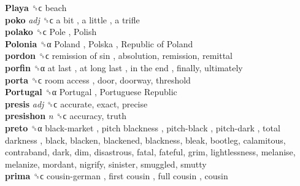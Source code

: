 \textbf{Playa} ␝ϲ  beach  \\
\textbf{poko} \emph{adj}  ␝ϲ   a bit ,  a little ,  a trifle   \\
\textbf{polako} ␝ϲ   Pole ,  Polish   \\
\textbf{Polonia} ␝α   Poland ,  Polska ,  Republic of Poland   \\
\textbf{pordon} ␝ϲ   remission of sin , absolution, remission, remittal  \\
\textbf{porfin} ␝α   at last ,  at long last ,  in the end , finally, ultimately  \\
\textbf{porta} ␝ϲ   room access , door, doorway, threshold  \\
\textbf{Portugal} ␝α   Portugal ,  Portuguese Republic   \\
\textbf{presis} \emph{adj}  ␝ϲ  accurate, exact, precise  \\
\textbf{presishon} \emph{n}  ␝ϲ  accuracy, truth  \\
\textbf{preto} ␝α   black-market ,  pitch blackness ,  pitch-black ,  pitch-dark ,  total darkness , black, blacken, blackened, blackness, bleak, bootleg, calamitous, contraband, dark, dim, disastrous, fatal, fateful, grim, lightlessness, melanise, melanize, mordant, nigrify, sinister, smuggled, smutty  \\
\textbf{prima} ␝ϲ   cousin-german ,  first cousin ,  full cousin , cousin  \\
